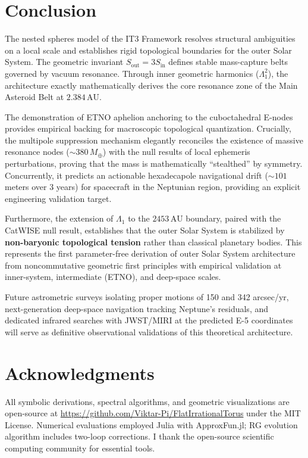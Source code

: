 \documentclass[11pt,a4paper]{article}
\theoremstyle{remark}
\newcommand{\AU}{\,\mathrm{AU}}
\newcommand{\Mearth}{\,M_\oplus}
\newcommand{\Lone}{\Lambda_1}
\begin{document}
\section{Conclusion}

The nested spheres model of the IT3 Framework resolves structural ambiguities on a local scale and establishes rigid topological boundaries for the outer Solar System. The geometric invariant $S_{\text{out}} = 3 S_{\text{in}}$ defines stable mass-capture belts governed by vacuum resonance. Through inner geometric harmonics ($\Lone^2$), the architecture exactly mathematically derives the core resonance zone of the Main Asteroid Belt at $2.384\AU$.

The demonstration of ETNO aphelion anchoring to the cuboctahedral E-nodes provides empirical backing for macroscopic topological quantization. Crucially, the multipole suppression mechanism elegantly reconciles the existence of massive resonance nodes ($\sim 380\Mearth$) with the null results of local ephemeris perturbations, proving that the mass is mathematically ``stealthed'' by symmetry. Concurrently, it predicts an actionable hexadecapole navigational drift ($\sim 101$ meters over 3 years) for spacecraft in the Neptunian region, providing an explicit engineering validation target.

Furthermore, the extension of $\Lone$ to the $2453\AU$ boundary, paired with the CatWISE null result, establishes that the outer Solar System is stabilized by \textbf{non-baryonic topological tension} rather than classical planetary bodies. This represents the first parameter-free derivation of outer Solar System architecture from noncommutative geometric first principles with empirical validation at inner-system, intermediate (ETNO), and deep-space scales.

Future astrometric surveys isolating proper motions of 150 and 342 arcsec/yr, next-generation deep-space navigation tracking Neptune's residuals, and dedicated infrared searches with JWST/MIRI at the predicted E-5 coordinates will serve as definitive observational validations of this theoretical architecture.

\section*{Acknowledgments}

All symbolic derivations, spectral algorithms, and geometric visualizations are open-source at \url{https://github.com/Viktar-Pi/FlatIrrationalTorus} under the MIT License. Numerical evaluations employed Julia with ApproxFun.jl; RG evolution algorithm includes two-loop corrections. I thank the open-source scientific computing community for essential tools.
\end{document}
